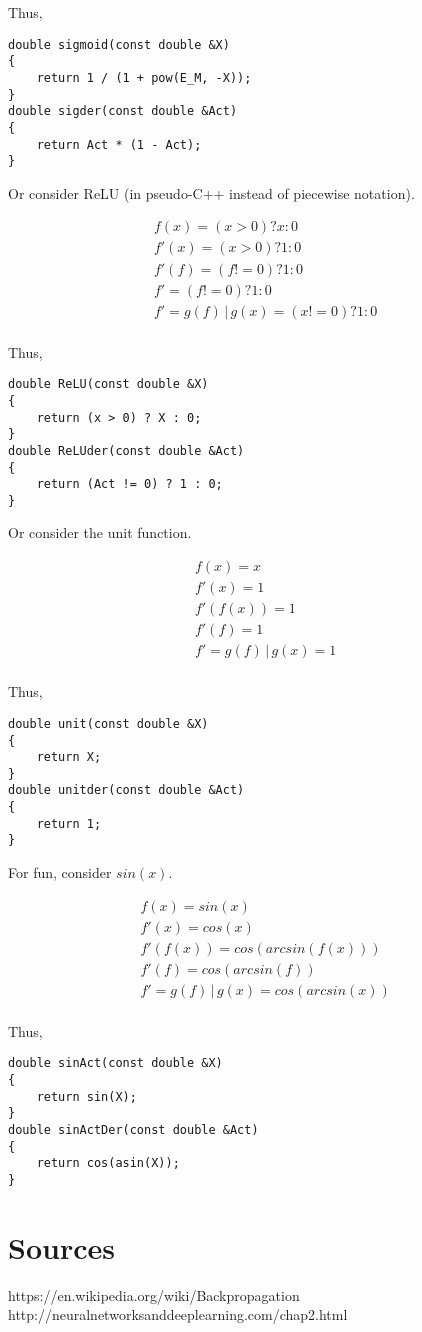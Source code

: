 \documentclass[8pt]{amsart}
\newcommand\where{\, \bigg\rvert \,}
\begin{document}
Thus,

\begin{verbatim}
double sigmoid(const double &X)
{
    return 1 / (1 + pow(E_M, -X));
}
double sigder(const double &Act)
{
    return Act * (1 - Act);
}
\end{verbatim}

Or consider ReLU (in pseudo-C++ instead of piecewise notation).

\[
    \begin{aligned}
        & f(x) = (x > 0) ? x : 0 \\
        & f'(x) = (x > 0) ? 1 : 0 \\
        & f'(f) = (f != 0) ? 1 : 0 \\
        & f' = (f != 0) ? 1 : 0 \\
        & f' = g(f) \where g(x) = (x != 0) ? 1 : 0 \\
    \end{aligned}
\]

Thus,

\begin{verbatim}
double ReLU(const double &X)
{
    return (x > 0) ? X : 0;
}
double ReLUder(const double &Act)
{
    return (Act != 0) ? 1 : 0;
}
\end{verbatim}

Or consider the unit function.

\[
    \begin{aligned}
        & f(x) = x \\
        & f'(x) = 1 \\
        & f'(f(x)) = 1 \\
        & f'(f) = 1 \\
        & f' = g(f) \where g(x) = 1 \\
    \end{aligned}
\]

Thus,

\begin{verbatim}
double unit(const double &X)
{
    return X;
}
double unitder(const double &Act)
{
    return 1;
}
\end{verbatim}

For fun, consider $sin(x)$.

\[
    \begin{aligned}
        & f(x) = sin(x) \\
        & f'(x) = cos(x) \\
        & f'(f(x)) = cos(arcsin(f(x))) \\
        & f'(f) = cos(arcsin(f)) \\
        & f' = g(f) \where g(x) = cos(arcsin(x)) \\
    \end{aligned}
\]

Thus,

\begin{verbatim}
double sinAct(const double &X)
{
    return sin(X);
}
double sinActDer(const double &Act)
{
    return cos(asin(X));
}
\end{verbatim}

\section{Sources}

https://en.wikipedia.org/wiki/Backpropagation \\
http://neuralnetworksanddeeplearning.com/chap2.html
\end{document}
